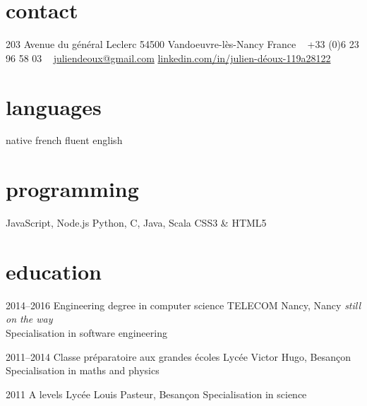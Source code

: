 \documentclass[]{lemaki-cv}
\begin{document}


	\begin{aside} %
		\section{contact}
		{\small 203 Avenue du général Leclerc
		54500 Vandoeuvre-lès-Nancy
		France}
		~
		{\small +33 (0)6 23 96 58 03}
		~
		\href{mailto:juliendeoux@gmail.com}{\small juliendeoux@gmail.com}
		\href{https://www.linkedin.com/in/julien-déoux-119a28122}{\small linkedin.com/in/julien-déoux-119a28122}
		\section{languages}
		{\small native french
		fluent english}
		\section{programming}
		{\small JavaScript, Node.js
		Python, C, Java, Scala
		CSS3 \& HTML5}
	\end{aside}


	\section{education}

	\begin{entrylist}


		\entry
		{2014--2016}
		{Engineering degree {\normalfont in computer science}}
		{TELECOM Nancy, Nancy}
		{\emph{still on the way} \\
		Specialisation in software engineering}


		\entry
		{2011--2014}
		{Classe préparatoire aux grandes écoles}
		{Lycée Victor Hugo, Besançon}
		{Specialisation in maths and physics}


		\entry
		{2011}
		{A levels}
		{Lycée Louis Pasteur, Besançon}
		{Specialisation in science}


	\end{entrylist}
\end{document}
